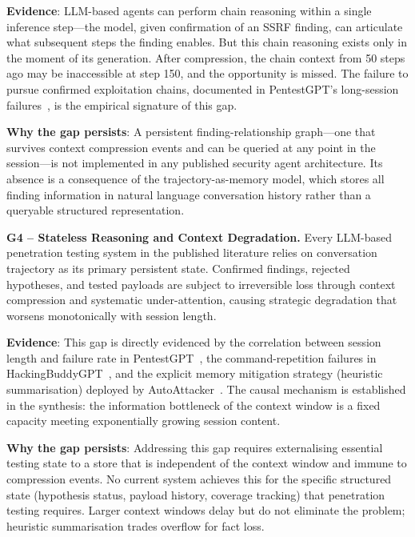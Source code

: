 \documentclass[12pt,a4paper,oneside,openany]{book}
\begin{document}
\textbf{Evidence}: LLM-based agents can perform chain reasoning within a single inference step---the model, given confirmation of an SSRF finding, can articulate what subsequent steps the finding enables. But this chain reasoning exists only in the moment of its generation. After compression, the chain context from 50 steps ago may be inaccessible at step 150, and the opportunity is missed. The failure to pursue confirmed exploitation chains, documented in PentestGPT's long-session failures~\citep{deng2024pentestgpt}, is the empirical signature of this gap.

\textbf{Why the gap persists}: A persistent finding-relationship graph---one that survives context compression events and can be queried at any point in the session---is not implemented in any published security agent architecture. Its absence is a consequence of the trajectory-as-memory model, which stores all finding information in natural language conversation history rather than a queryable structured representation.

\vspace{0.4cm}


\noindent\textbf{G4 -- Stateless Reasoning and Context Degradation.} Every LLM-based penetration testing system in the published literature relies on conversation trajectory as its primary persistent state. Confirmed findings, rejected hypotheses, and tested payloads are subject to irreversible loss through context compression and systematic under-attention, causing strategic degradation that worsens monotonically with session length.


\textbf{Evidence}: This gap is directly evidenced by the correlation between session length and failure rate in PentestGPT~\citep{deng2024pentestgpt}, the command-repetition failures in HackingBuddyGPT~\citep{happe2023hackerllm}, and the explicit memory mitigation strategy (heuristic summarisation) deployed by AutoAttacker~\citep{xu2024autoattacker}. The causal mechanism is established in the synthesis: the information bottleneck of the context window is a fixed capacity meeting exponentially growing session content.

\textbf{Why the gap persists}: Addressing this gap requires externalising essential testing state to a store that is independent of the context window and immune to compression events. No current system achieves this for the specific structured state (hypothesis status, payload history, coverage tracking) that penetration testing requires. Larger context windows delay but do not eliminate the problem; heuristic summarisation trades overflow for fact loss.
\end{document}
